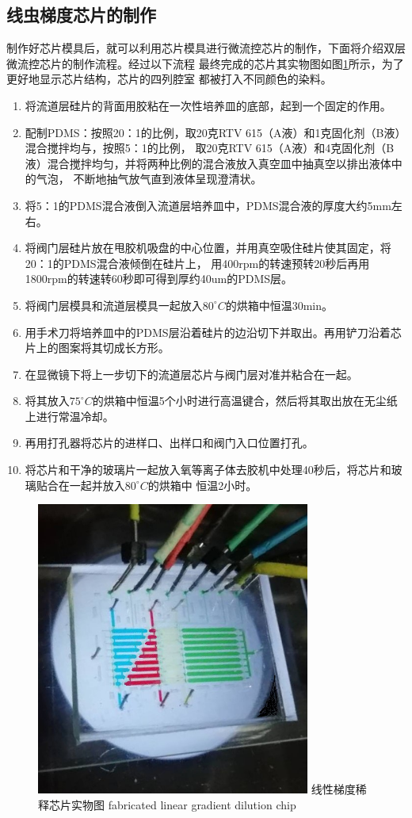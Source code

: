 \subsection{线虫梯度芯片的制作}
	制作好芯片模具后，就可以利用芯片模具进行微流控芯片的制作，下面将介绍双层微流控芯片的制作流程。经过以下流程
	最终完成的芯片其实物图如图\ref{fig:chap2:chip-fabric}所示，为了更好地显示芯片结构，芯片的四列腔室
	都被打入不同颜色的染料。
	\begin{enumerate}[label={(\arabic*)},font={\color{black!50!black}\bfseries}]
	\item 将流道层硅片的背面用胶粘在一次性培养皿的底部，起到一个固定的作用。
	\item 配制PDMS：按照20：1的比例，取20克RTV 615（A液）和1克固化剂（B液）混合搅拌均与，按照5：1的比例，
	取20克RTV 615（A液）和4克固化剂（B液）混合搅拌均匀，并将两种比例的混合液放入真空皿中抽真空以排出液体中的气泡，
	不断地抽气放气直到液体呈现澄清状。
	\item 将5：1的PDMS混合液倒入流道层培养皿中，PDMS混合液的厚度大约5mm左右。
	\item 将阀门层硅片放在甩胶机吸盘的中心位置，并用真空吸住硅片使其固定，将20：1的PDMS混合液倾倒在硅片上，
	用400rpm的转速预转20秒后再用1800rpm的转速转60秒即可得到厚约40um的PDMS层。
	\item 将阀门层模具和流道层模具一起放入$80^\circ C$的烘箱中恒温30min。
	\item 用手术刀将培养皿中的PDMS层沿着硅片的边沿切下并取出。再用铲刀沿着芯片上的图案将其切成长方形。
	\item 在显微镜下将上一步切下的流道层芯片与阀门层对准并粘合在一起。
	\item 将其放入$75^\circ C$的烘箱中恒温5个小时进行高温键合，然后将其取出放在无尘纸上进行常温冷却。
	\item 再用打孔器将芯片的进样口、出样口和阀门入口位置打孔。
	\item 将芯片和干净的玻璃片一起放入氧等离子体去胶机中处理40秒后，将芯片和玻璃贴合在一起并放入$80^\circ C$的烘箱中
	恒温2小时。
	\end{enumerate}
	\begin{figure}[htbp]
	  \centering
	  \includegraphics[width=9cm]{figure/chap2/fabric-chip.jpg}
	  \bicaption
		{线性梯度稀释芯片实物图}
		{fabricated linear gradient dilution chip}
	  \label{fig:chap2:chip-fabric}
	\end{figure}
